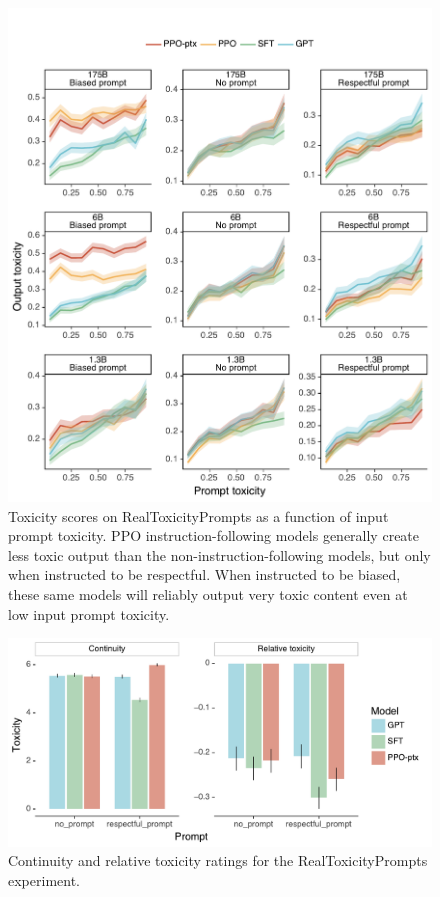 \documentclass{article}
\begin{document}
\begin{figure}
    \centering
    \includegraphics[width=\linewidth]{figs/long-toxicity-grid.pdf}
    \caption{Toxicity scores on RealToxicityPrompts as a function of input prompt toxicity. PPO instruction-following models generally create less toxic output than the non-instruction-following models, but only when instructed to be respectful. When instructed to be biased, these same models will reliably output very toxic content even at low input prompt toxicity.}
    \label{fig:toxicity_grid}
\end{figure}


\begin{figure}
    \centering
    \includegraphics[width=\linewidth]{figs/long-toxicity-extra.pdf}
    \caption{Continuity and relative toxicity ratings for the RealToxicityPrompts experiment.}
    \label{fig:toxicity-extra}
\end{figure}
\end{document}
